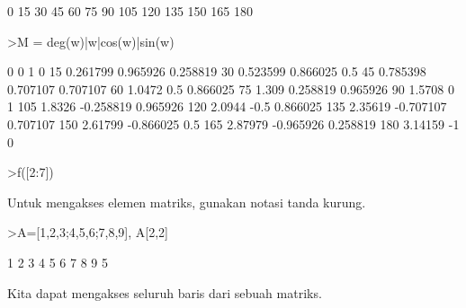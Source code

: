 \documentclass[a4paper,10pt]{article}
\begin{document}
\begin{eulernotebook}
\begin{eulercomment}
\begin{eulercomment}
\begin{eulercomment}
\begin{eulercomment}
\begin{eulercomment}
\begin{eulercomment}
\begin{eulerprompt}
\end{eulerprompt}
\begin{euleroutput}
              0 
             15 
             30 
             45 
             60 
             75 
             90 
            105 
            120 
            135 
            150 
            165 
            180 
\end{euleroutput}
\begin{eulerprompt}
>M = deg(w)|w|cos(w)|sin(w)
\end{eulerprompt}
\begin{euleroutput}
              0             0             1             0 
             15      0.261799      0.965926      0.258819 
             30      0.523599      0.866025           0.5 
             45      0.785398      0.707107      0.707107 
             60        1.0472           0.5      0.866025 
             75         1.309      0.258819      0.965926 
             90        1.5708             0             1 
            105        1.8326     -0.258819      0.965926 
            120        2.0944          -0.5      0.866025 
            135       2.35619     -0.707107      0.707107 
            150       2.61799     -0.866025           0.5 
            165       2.87979     -0.965926      0.258819 
            180       3.14159            -1             0 
\end{euleroutput}
\begin{eulerprompt}
>f([2:7])
\end{eulerprompt}
\begin{euleroutput}
  [2.05045,  13.7251,  113.336,  1241.03,  17128.1,  284713]
\end{euleroutput}
\begin{eulercomment}
\begin{eulercomment}
\begin{eulercomment}
Untuk mengakses elemen matriks, gunakan notasi tanda kurung.
\end{eulercomment}
\begin{eulerprompt}
>A=[1,2,3;4,5,6;7,8,9], A[2,2]
\end{eulerprompt}
\begin{euleroutput}
              1             2             3 
              4             5             6 
              7             8             9 
  5
\end{euleroutput}
\begin{eulercomment}
Kita dapat mengakses seluruh baris dari sebuah matriks.

\end{eulercomment}
\end{eulercomment}
\end{eulercomment}
\end{eulercomment}
\end{eulercomment}
\end{eulercomment}
\end{eulercomment}
\end{eulercomment}
\end{eulercomment}
\end{eulernotebook}
\end{document}
